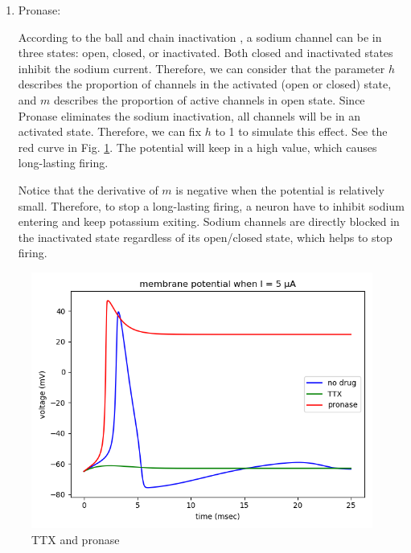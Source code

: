 \documentclass[11pt]{article}
\begin{document}
\begin{enumerate}
\begin{enumerate}
    		\item Pronase:
		
    		According to the ball and chain inactivation \cite[pg. 156-158]{kandel2012principles}, a sodium channel can be in three states: open, closed, or inactivated. Both closed and inactivated states inhibit the sodium current. Therefore, we can consider that the parameter $h$ describes the proportion of channels in the activated (open or closed) state, and $m$ describes the proportion of active channels in open state. Since Pronase eliminates the sodium inactivation, all channels will be in an activated state. Therefore, we can fix $h$ to 1 to simulate this effect. See the red curve in Fig. \ref{fig:fig5}. The potential will keep in a high value, which causes long-lasting firing.
    		
    		Notice that the derivative of $m$ is negative when the potential is relatively small. Therefore, to stop a long-lasting firing, a neuron have to inhibit sodium entering and keep potassium exiting. Sodium channels are directly blocked in the inactivated state regardless of its open/closed state, which helps to stop firing.
		
		\end{enumerate}
		
		\begin{figure}[ht]
			\centering
			\includegraphics[width=.6\textwidth]{plot_programming_7.png}
			\caption{TTX and pronase}
			\label{fig:fig5}
		\end{figure}
	\end{enumerate}
	
	
    
\end{document}
